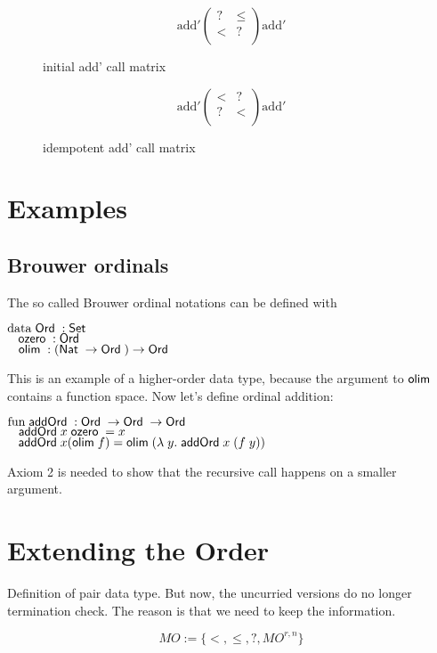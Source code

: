 \begin{figure}[p]

\[
\mathrm{add'} \begin{pmatrix}

? & \leq \\
< & ?   \\

\end{pmatrix} \mathrm{add'}
\]

\caption{initial add' call matrix}

\end{figure}

\begin{figure}[p]

\[
\mathrm{add'} \begin{pmatrix}

< & ?    \\
? & <    \\

\end{pmatrix} \mathrm{add'}
\] 

\caption{idempotent add' call matrix}

\end{figure}

\section{Examples}

\subsection{Brouwer ordinals}
The so called Brouwer ordinal notations can be defined with
\begin{bsp}
$\mathrm{data}\; \mathsf{Ord}\; : \mathsf{Set}$ \\
$\hspace*{3mm} \mathsf{ozero}\; : \mathsf{Ord}\; $\\
$\hspace*{3mm} \mathsf{olim}\; : (\mathsf{Nat}\; \rightarrow \mathsf{Ord}\; ) \rightarrow \mathsf{Ord}\; $
\end{bsp}
This is an example of a higher-order data type, because the argument to $\mathsf{olim}\;$ contains a function space.
Now let's define ordinal addition:
\begin{bsp}
$\mathrm{fun}\; \mathsf{addOrd}\; : \mathsf{Ord}\; \rightarrow \mathsf{Ord}\; \rightarrow \mathsf{Ord}\;$\\
$\hspace*{3mm} \mathsf{addOrd}\; x \; \mathsf{ozero}\; = x $\\
$\hspace*{3mm} \mathsf{addOrd}\; x (\mathsf{olim}\; f) = \mathsf{olim}\; ( \lambda\; y .\; \mathsf{addOrd}\;  x \; (f \; y))  $
\end{bsp}
Axiom 2 is needed to show that the recursive call happens on a smaller argument.
\section{Extending the Order}
Definition of pair data type.
But now, the uncurried versions do no longer termination check.
The reason is that we need to keep the information.
\begin{definition}[MOrder]
\[ MO := \{ < , \leq , ? , MO^{r,n}\} \]
\end{definition}

